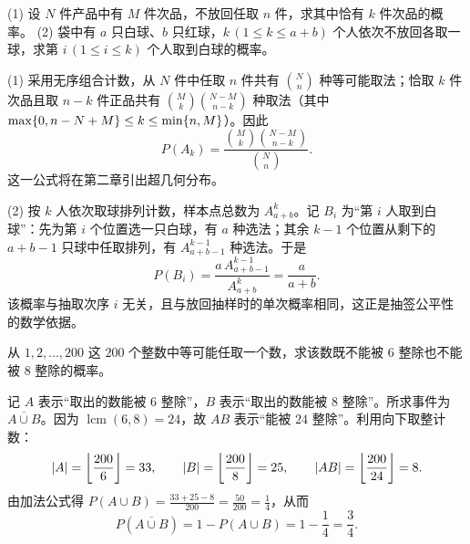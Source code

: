 \begin{example}[title={超几何抽样与抽签公平性}]
\label{eg:hypergeometric-lottery}
(1) 设 $N$ 件产品中有 $M$ 件次品，不放回任取 $n$ 件，求其中恰有 $k$ 件次品的概率。
(2) 袋中有 $a$ 只白球、$b$ 只红球，$k\,(1\le k\le a+b)$ 个人依次不放回各取一球，求第 $i\,(1\le i\le k)$ 个人取到白球的概率。
\begin{solution}
(1) 采用无序组合计数，从 $N$ 件中任取 $n$ 件共有 $\binom{N}{n}$ 种等可能取法；恰取 $k$ 件次品且取 $n-k$ 件正品共有 $\binom{M}{k}\binom{N-M}{n-k}$ 种取法（其中 $\max\{0,n-N+M\}\le k\le\min\{n,M\}$）。因此
\begin{equation}
  P(A_k)=\frac{\binom{M}{k}\binom{N-M}{n-k}}{\binom{N}{n}}.
  \label{eq:hypergeometric-prob}
\end{equation}
这一公式将在第二章引出超几何分布。

(2) 按 $k$ 人依次取球排列计数，样本点总数为 $A_{a+b}^k$。记 $B_i$ 为“第 $i$ 人取到白球”：先为第 $i$ 个位置选一只白球，有 $a$ 种选法；其余 $k-1$ 个位置从剩下的 $a+b-1$ 只球中任取排列，有 $A_{a+b-1}^{k-1}$ 种选法。于是
\[
  P(B_i)=\frac{a\,A_{a+b-1}^{k-1}}{A_{a+b}^k}=\frac{a}{a+b}.
\]
该概率与抽取次序 $i$ 无关，且与放回抽样时的单次概率相同，这正是抽签公平性的数学依据。
\end{solution}
\end{example}

\begin{example}[title={整除计数与容斥公式}]
\label{eg:divisibility-count}
从 $1,2,\ldots,200$ 这 $200$ 个整数中等可能任取一个数，求该数既不能被 $6$ 整除也不能被 $8$ 整除的概率。
\begin{solution}
记 $A$ 表示“取出的数能被 $6$ 整除”，$B$ 表示“取出的数能被 $8$ 整除”。所求事件为 $\overline{A\cup B}$。因为 $\operatorname{lcm}(6,8)=24$，故 $AB$ 表示“能被 $24$ 整除”。利用向下取整计数：
\[
  \lvert A\rvert=\left\lfloor\frac{200}{6}\right\rfloor=33,\qquad
  \lvert B\rvert=\left\lfloor\frac{200}{8}\right\rfloor=25,\qquad
  \lvert AB\rvert=\left\lfloor\frac{200}{24}\right\rfloor=8.
\]
由加法公式得 $P(A\cup B)=\frac{33+25-8}{200}=\frac{50}{200}=\frac{1}{4}$，从而
\[
  P(\overline{A\cup B})=1-P(A\cup B)=1-\frac{1}{4}=\frac{3}{4}.
\]
\end{solution}
\end{example}

